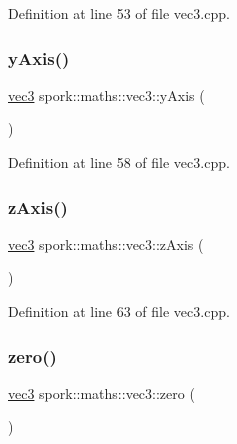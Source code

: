 Definition at line 53 of file vec3.\+cpp.

\mbox{\label{structspork_1_1maths_1_1vec3_a0a655d16fc128c7c288cf77d50fb51cc}} 
\subsubsection{\texorpdfstring{y\+Axis()}{yAxis()}}
{\footnotesize\ttfamily \hyperlink{structspork_1_1maths_1_1vec3}{vec3} spork\+::maths\+::vec3\+::y\+Axis (\begin{DoxyParamCaption}{ }\end{DoxyParamCaption})\hspace{0.3cm}{\ttfamily [static]}}



Definition at line 58 of file vec3.\+cpp.

\mbox{\label{structspork_1_1maths_1_1vec3_a60f7fb8ce3a15cb3d4a7b77848244e3b}} 
\subsubsection{\texorpdfstring{z\+Axis()}{zAxis()}}
{\footnotesize\ttfamily \hyperlink{structspork_1_1maths_1_1vec3}{vec3} spork\+::maths\+::vec3\+::z\+Axis (\begin{DoxyParamCaption}{ }\end{DoxyParamCaption})\hspace{0.3cm}{\ttfamily [static]}}



Definition at line 63 of file vec3.\+cpp.

\mbox{\label{structspork_1_1maths_1_1vec3_a8dbbfad5ee61d3f78a172bf9f2bcbcef}} 
\subsubsection{\texorpdfstring{zero()}{zero()}}
{\footnotesize\ttfamily \hyperlink{structspork_1_1maths_1_1vec3}{vec3} spork\+::maths\+::vec3\+::zero (\begin{DoxyParamCaption}{ }\end{DoxyParamCaption})\hspace{0.3cm}{\ttfamily [static]}}



